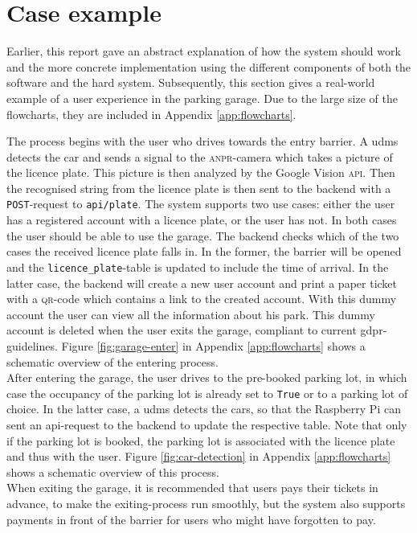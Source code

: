 \section{Case example}\label{sec:case-example}
Earlier, this report gave an abstract explanation of how the system should work and the more concrete implementation using the different components of both the software and the hard system. Subsequently, this section gives a real-world example of a user experience in the parking garage. Due to the large size of the flowcharts, they are included in Appendix \ref{app:flowcharts}.

The process begins with the user who drives towards the entry barrier. A \ac{udms} detects the car and sends a signal to the \textsc{anpr}-camera which takes a picture of the licence plate. This picture is then analyzed by the Google Vision \textsc{api}. Then the recognised string from the licence plate is then sent to the backend with a \texttt{POST}-request to \texttt{api/plate}. The system supports two use cases: either the user has a registered account with a licence plate, or the user has not. In both cases the user should be able to use the garage. The backend checks which of the two cases the received licence plate falls in. In the former, the barrier will be opened and the \verb|licence_plate|-table is updated to include the time of arrival. In the latter case, the backend will create a new user account and print a paper ticket with a \textsc{qr}-code which contains a link to the created account. With this dummy account the user can view all the information about his park. This dummy account is deleted when the user exits the garage, compliant to current \ac{gdpr}-guidelines. Figure \ref{fig:garage-enter} in Appendix \ref{app:flowcharts} shows a schematic overview of the entering process. \\

After entering the garage, the user drives to the pre-booked parking lot, in which case the occupancy of the parking lot is already set to \texttt{True} or to a parking lot of choice. In the latter case, a \ac{udms} detects the cars, so that the Raspberry Pi can sent an \ac{api}-request to the backend to update the respective table. Note that only if the parking lot is booked, the parking lot is associated with the licence plate and thus with the user. Figure \ref{fig:car-detection} in Appendix \ref{app:flowcharts} shows a schematic overview of this process. \\

When exiting the garage, it is recommended that users pays their tickets in advance, to make the exiting-process run smoothly, but the system also supports payments in front of the barrier for users who might have forgotten to pay.

